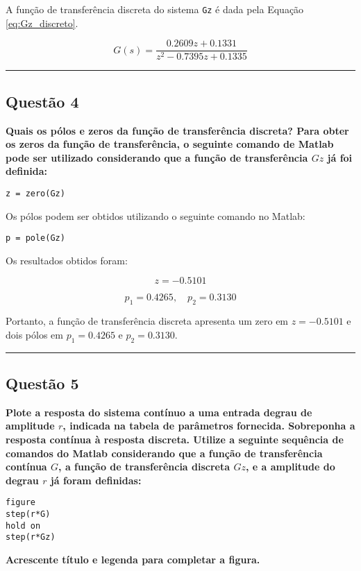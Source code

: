 A função de transferência discreta do sistema \texttt{Gz} é dada pela Equação \ref{eq:Gz_discreto}.

\begin{equation}
\label{eq:Gz_discreto}
   G(s) = \frac{0.2609 z + 0.1331}{z^2 - 0.7395z + 0.1335}
\end{equation}

\vspace{10pt}
\hrule

\subsection{Questão 4}
\textbf{Quais os pólos e zeros da função de transferência discreta? Para obter os zeros da função de transferência, o seguinte comando de Matlab pode ser utilizado considerando que a função de transferência \( Gz \) já foi definida:}
\begin{verbatim}
z = zero(Gz)
\end{verbatim}

Os pólos podem ser obtidos utilizando o seguinte comando no Matlab:

\begin{verbatim}
p = pole(Gz)
\end{verbatim}

Os resultados obtidos foram:

\[
z = -0.5101
\]

\[
p_1 = 0.4265, \quad p_2 = 0.3130
\]

Portanto, a função de transferência discreta apresenta um zero em \( z = -0.5101 \) e dois pólos em \( p_1 = 0.4265 \) e \( p_2 = 0.3130 \).

\vspace{10pt}
\hrule

\subsection{Questão 5}
\textbf{Plote a resposta do sistema contínuo a uma entrada degrau de amplitude \( r \), indicada na tabela de parâmetros fornecida. Sobreponha a resposta contínua à resposta discreta. Utilize a seguinte sequência de comandos do Matlab considerando que a função de transferência contínua \( G \), a função de transferência discreta \( Gz \), e a amplitude do degrau \( r \) já foram definidas:}
\begin{verbatim}
figure
step(r*G)
hold on
step(r*Gz)
\end{verbatim}
\textbf{Acrescente título e legenda para completar a figura.}

